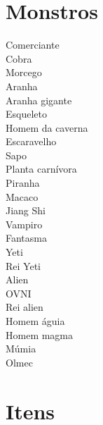\section{\label{section:spelunky-monsters}Monstros}

\begin{description}
    \item[Comerciante]
    \item[Cobra]
    \item[Morcego]
    \item[Aranha]
    \item[Aranha gigante]
    \item[Esqueleto]
    \item[Homem da caverna]
    \item[Escaravelho]
    \item[Sapo]
    \item[Planta carnívora]
    \item[Piranha]
    \item[Macaco]
    \item[Jiang Shi]
    \item[Vampiro]
    \item[Fantasma]
    \item[Yeti]
    \item[Rei Yeti]
    \item[Alien]
    \item[OVNI]
    \item[Rei alien]
    \item[Homem águia]
    \item[Homem magma]
    \item[Múmia]
    \item[Olmec]
\end{description}

\section{\label{section:spelunky-items}Itens}

